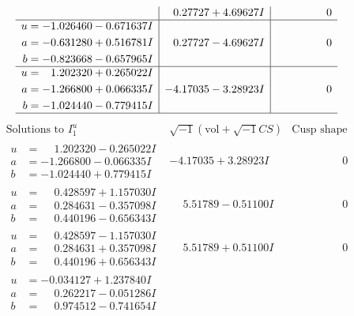 \documentclass[1p]{elsarticle_modified}
\theoremstyle{definition}
\newcommand{\I}{\sqrt{-1}}
\begin{document}
$$\begin{array}{c|c|c}
 & \phantom{-}0.27727 + 4.69627 I & \phantom{-0.000000 } 0 \\ \hline\begin{aligned}
u &= -1.026460 - 0.671637 I \\
a &= -0.631280 + 0.516781 I \\
b &= -0.823668 - 0.657965 I\end{aligned}
 & \phantom{-}0.27727 - 4.69627 I & \phantom{-0.000000 } 0 \\ \hline\begin{aligned}
u &= \phantom{-}1.202320 + 0.265022 I \\
a &= -1.266800 + 0.066335 I \\
b &= -1.024440 - 0.779415 I\end{aligned}
 & -4.17035 - 3.28923 I & \phantom{-0.000000 } 0\\
 \hline 
 \end{array}$$\newpage$$\begin{array}{c|c|c}  
\text{Solutions to }I^u_{1}& \I (\text{vol} + \sqrt{-1}CS) & \text{Cusp shape}\\
 \hline 
\begin{aligned}
u &= \phantom{-}1.202320 - 0.265022 I \\
a &= -1.266800 - 0.066335 I \\
b &= -1.024440 + 0.779415 I\end{aligned}
 & -4.17035 + 3.28923 I & \phantom{-0.000000 } 0 \\ \hline\begin{aligned}
u &= \phantom{-}0.428597 + 1.157030 I \\
a &= \phantom{-}0.284631 - 0.357098 I \\
b &= \phantom{-}0.440196 - 0.656343 I\end{aligned}
 & \phantom{-}5.51789 - 0.51100 I & \phantom{-0.000000 } 0 \\ \hline\begin{aligned}
u &= \phantom{-}0.428597 - 1.157030 I \\
a &= \phantom{-}0.284631 + 0.357098 I \\
b &= \phantom{-}0.440196 + 0.656343 I\end{aligned}
 & \phantom{-}5.51789 + 0.51100 I & \phantom{-0.000000 } 0 \\ \hline\begin{aligned}
u &= -0.034127 + 1.237840 I \\
a &= \phantom{-}0.262217 - 0.051286 I \\
b &= \phantom{-}0.974512 - 0.741654 I\end{aligned}

\end{array}$$
\end{document}
